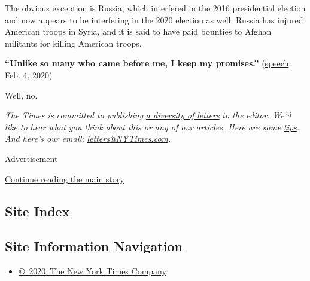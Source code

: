 The obvious exception is Russia, which interfered in the 2016
presidential election and now appears to be interfering in the 2020
election as well. Russia has injured American troops in Syria, and it is
said to have paid bounties to Afghan militants for killing American
troops.

\textbf{``Unlike so many who came before me, I keep my promises.''}
(\href{https://www.pbs.org/newshour/politics/read-the-full-text-of-trumps-2020-state-of-the-union}{speech},
Feb. 4, 2020)

Well, no.

\emph{The Times is committed to publishing}
\href{https://www.nytimes3xbfgragh.onion/2019/01/31/opinion/letters/letters-to-editor-new-york-times-women.html}{\emph{a
diversity of letters}} \emph{to the editor. We'd like to hear what you
think about this or any of our articles. Here are some}
\href{https://help.nytimes3xbfgragh.onion/hc/en-us/articles/115014925288-How-to-submit-a-letter-to-the-editor}{\emph{tips}}\emph{.
And here's our email:}
\href{mailto:letters@NYTimes.com}{\emph{letters@NYTimes.com}}\emph{.}

Advertisement

\protect\hyperlink{after-bottom}{Continue reading the main story}

\hypertarget{site-index}{%
\subsection{Site Index}\label{site-index}}

\hypertarget{site-information-navigation}{%
\subsection{Site Information
Navigation}\label{site-information-navigation}}

\begin{itemize}
\tightlist
\item
  \href{https://help.nytimes3xbfgragh.onion/hc/en-us/articles/115014792127-Copyright-notice}{©~2020~The
  New York Times Company}
\end{itemize}

